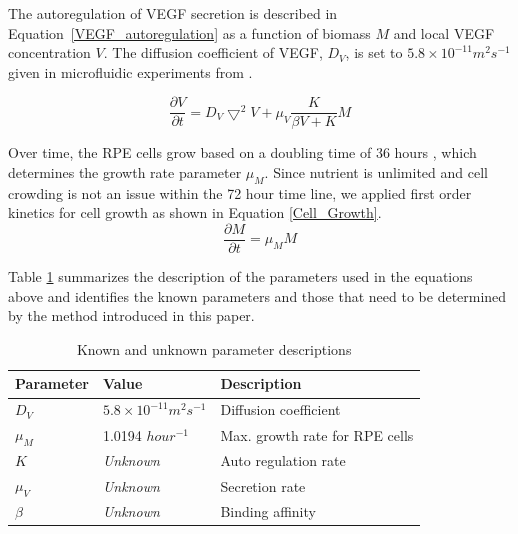  The autoregulation of VEGF secretion is described in Equation~\ref{VEGF_autoregulation} as a function of biomass $M$ and local VEGF concentration $V$. The diffusion coefficient of VEGF, $D_{V}$, is set to $5.8 \times 10^{-11} m^{2} s^{-1}$ given in microfluidic experiments from \cite{qanitabaker:Shin2012Microfluidic}.

 \begin{equation}
 \frac{\partial V}{\partial t}=D_{V}\bigtriangledown^{2} V+ \mu _{V}  \frac{K}{ \beta V+K} M
 \label{VEGF_autoregulation}
 \end{equation}

Over time, the RPE cells grow based on a doubling time of 36 hours \cite{qanitabaker:Bryckaert2000Regulation}, which determines the growth rate parameter $\mu _{M}$. Since nutrient is unlimited and cell crowding is not an issue within the 72 hour time line, we applied first order kinetics for cell growth as shown in Equation \ref{Cell_Growth}.\\


\begin{equation}
\frac{\partial M}{\partial t}=   \mu _{M} M
\label{Cell_Growth}
\end{equation}

Table \ref{parameters} summarizes the description of the parameters used in the equations above and identifies the known parameters and those that need to be determined by the method introduced in this paper.

\begin{table}[ht]
\caption{ Known and unknown parameter descriptions} %
\centering
\begin{footnotesize}
\begin{tabular}{l l l}
\hline
Parameter   &  Value & Description\\ \hline \hline
$D_{V}$     & $5.8 \times 10^{-11} m^{2} s^{-1}$ & Diffusion coefficient \\
$\mu _{M}$  &  1.0194   $ hour^{-1}$                 & Max. growth rate for RPE cells \\
[1ex]      %
\hline
$K$       &  \textsl{Unknown}                  & Auto regulation rate \\
$\mu _{V}$ & \textsl{Unknown}                   & Secretion rate \\
$\beta $    &  \textsl{Unknown}                  & Binding affinity \\
[1ex]      %
 

 
 
\hline
\end{tabular}
\end{footnotesize}
\label{parameters}
\end{table}

